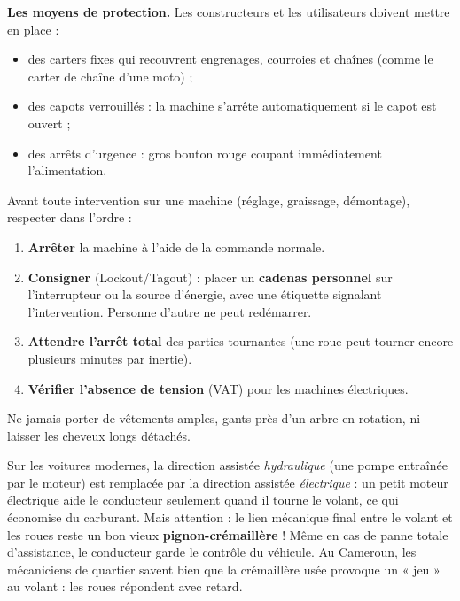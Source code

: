 \documentclass[11pt]{article}
\newcommand{\cle}[1]{{\popxbold\color{popdark}#1}}
\begin{document}
\textbf{Les moyens de protection.} Les constructeurs et les utilisateurs doivent mettre en place :
\begin{itemize}
\item des \cle{carters fixes} qui recouvrent engrenages, courroies et chaînes (comme le carter de chaîne d'une moto) ;
\item des \cle{capots verrouillés} : la machine s'arrête automatiquement si le capot est ouvert ;
\item des \cle{arrêts d'urgence} : gros bouton rouge coupant immédiatement l'alimentation.
\end{itemize}

\begin{attention}
Avant toute intervention sur une machine (réglage, graissage, démontage), respecter dans l'ordre :
\begin{enumerate}
\item \textbf{Arrêter} la machine à l'aide de la commande normale.
\item \textbf{Consigner} (Lockout/Tagout) : placer un \textbf{cadenas personnel} sur l'interrupteur ou la source d'énergie, avec une étiquette signalant l'intervention. Personne d'autre ne peut redémarrer.
\item \textbf{Attendre l'arrêt total} des parties tournantes (une roue peut tourner encore plusieurs minutes par inertie).
\item \textbf{Vérifier l'absence de tension} (VAT) pour les machines électriques.
\end{enumerate}
Ne jamais porter de vêtements amples, gants près d'un arbre en rotation, ni laisser les cheveux longs détachés.
\end{attention}

\begin{savaistu}
Sur les voitures modernes, la direction assistée \emph{hydraulique} (une pompe entraînée par le moteur) est remplacée par la direction assistée \emph{électrique} : un petit moteur électrique aide le conducteur seulement quand il tourne le volant, ce qui économise du carburant. Mais attention : le lien mécanique final entre le volant et les roues reste un bon vieux \textbf{pignon-crémaillère} ! Même en cas de panne totale d'assistance, le conducteur garde le contrôle du véhicule. Au Cameroun, les mécaniciens de quartier savent bien que la crémaillère usée provoque un « jeu » au volant : les roues répondent avec retard.
\end{savaistu}
\end{document}
